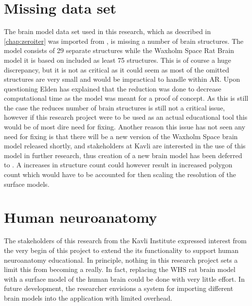 \section{Missing data set}\label{chap:missingdataset}
The brain model data set used in this research, which as described in \autoref{chap:zeroiter} was imported from , is missing a number of brain structures. The model consists of 29 separate structures while the Waxholm Space Rat Brain model it is based on included as least 75 structures. This is of course a huge discrepancy, but it is not as critical as it could seem as most of the omitted structures are very small and would be impractical to handle within AR. Upon questioning Elden has explained that the reduction was done to decrease computational time as the model was meant for a proof of concept. As this is still the case the reduces number of brain structures is still not a critical issue, however if this research project were to be used as an actual educational tool this would be of most dire need for fixing. Another reason this issue has not seen any need for fixing is that there will be a new version of the Waxholm Space brain model released shortly, and stakeholders at Kavli are interested in the use of this model in further research, thus creation of a new brain model has been deferred to . A increases in structure count could however result in increased polygon count which would have to be accounted for then scaling the resolution of the surface models.

\section{Human neuroanatomy}

The stakeholders of this research from the Kavli Institute expressed interest from the very begin of this project to extend the its functionality to support human neuroanatomy educational. In principle, nothing in this research project sets a limit this from becoming a really. In fact, replacing the WHS rat brain model with a surface model of the human brain could be done with very little effort. In future development, the researcher envisions a system for importing different brain models into the application with limited overhead. 




